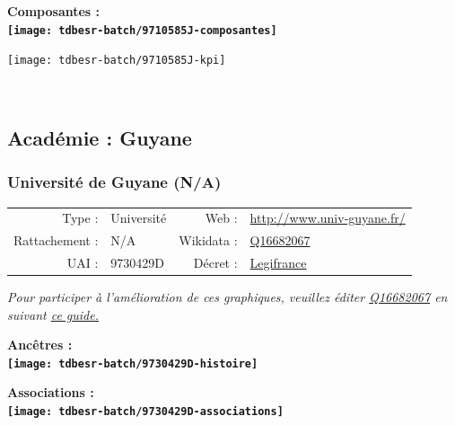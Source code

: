 \documentclass[12pt,french,]{article}
\begin{document}
\hrulefill

\begin{center} \bf Composantes : \\  
\texttt{[image: tdbesr-batch/9710585J-composantes]} \end{center}

\begin{center}\texttt{[image: tdbesr-batch/9710585J-kpi]} \end{center}\checkoddpage

\ifoddpage ~\newpage \fi   

\hypertarget{acaduxe9mie-guyane}{%
\subsection{Académie : Guyane}\label{acaduxe9mie-guyane}}

\hypertarget{universituxe9-de-guyane-na}{%
\subsubsection{Université de Guyane
(N/A)}\label{universituxe9-de-guyane-na}}

\begin{tabular*}{\textwidth}{rp{5cm}rl}  
\hline  
Type : & Université & Web : &\href{http://www.univ-guyane.fr/}{http://www.univ-guyane.fr/} \\  
Rattachement : & N/A & Wikidata : & \href{https://www.wikidata.org/entity/Q16682067}{Q16682067} \\  
UAI : & 9730429D & Décret : & \href{http://www.legifrance.gouv.fr/affichTexte.do;jsessionid=?cidTexte=JORFTEXT000029310823&dateTexte=&oldAction=dernierJO&categorieLien=id}{Legifrance} \\  
\hline  
\end{tabular*}

\textit{\scriptsize Pour participer à l'amélioration de ces graphiques, veuillez éditer  \href{https://www.wikidata.org/entity/Q16682067}{Q16682067}  en suivant \href{https://github.com/cpesr/wikidataESR/blob/master/Rmd/wikidataESR.md}{ce guide.}}

\vspace{1cm}  
\begin{minipage}[b]{0.50\textwidth}\begin{center} \bf Ancêtres : \\  
\texttt{[image: tdbesr-batch/9730429D-histoire]} \end{center}\end{minipage}\begin{minipage}[b]{0.50\textwidth}\begin{center} \bf Associations : \\  
\texttt{[image: tdbesr-batch/9730429D-associations]} \end{center}\end{minipage}
\end{document}
